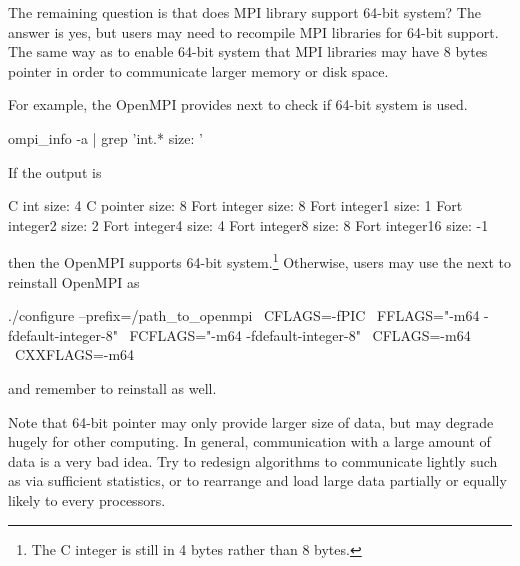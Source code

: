 The remaining question is that does MPI library support 64-bit system?
The answer is yes, but users may need to recompile MPI libraries for
64-bit support.
The same way as  to enable 64-bit system that MPI libraries
may have 8 bytes pointer in order to communicate larger memory or disk space.

For example, the OpenMPI provides next to check if 64-bit system is used.
\begin{Command}
ompi_info -a | grep 'int.* size: '
\end{Command}
If the output is
\begin{Command}
              C int size: 4
          C pointer size: 8
       Fort integer size: 8
      Fort integer1 size: 1
      Fort integer2 size: 2
      Fort integer4 size: 4
      Fort integer8 size: 8
     Fort integer16 size: -1
\end{Command}
then the OpenMPI supports 64-bit system.\footnote{
\color{red}
The C integer is still in 4 bytes rather than 8 bytes.
}
Otherwise, users may use the next to reinstall OpenMPI as
\begin{Command}
./configure --prefix=/path_to_openmpi \
            CFLAGS=-fPIC \
            FFLAGS="-m64 -fdefault-integer-8" \
            FCFLAGS="-m64 -fdefault-integer-8" \
            CFLAGS=-m64 \
            CXXFLAGS=-m64
\end{Command}
and remember to reinstall \pkg{pbdMPI} as well.

Note that 64-bit pointer may only provide larger size of data, but
may degrade hugely for other computing. In general, communication with a
large amount of data is a very bad idea. Try to redesign algorithms to
communicate lightly such as via sufficient statistics, or to rearrange and
load large data partially or equally likely to every processors.

